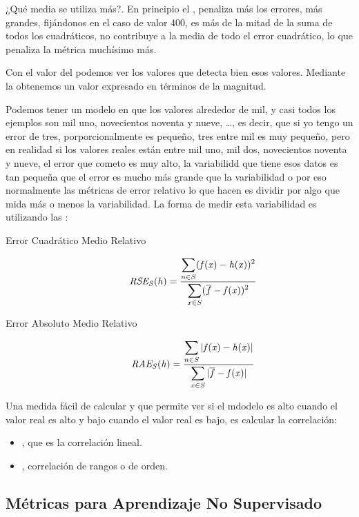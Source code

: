 ¿Qué media se utiliza más?. En principio el , penaliza más los errores, más grandes, fijándonos en el caso de valor 400, es más de la mitad de la suma de todos los cuadráticos, no contribuye a la media de todo el error cuadrático, lo que penaliza la métrica muchísimo más.

Con el valor del  podemos ver los valores que detecta bien esos valores. Mediante la  obtenemos un valor expresado en términos de la magnitud.

Podemos tener un modelo en que los valores alrededor de mil, y casi todos los ejemplos son mil uno, novecientos noventa y nueve, \ldots, es decir, que si yo tengo un error de tres, porporcionalmente es pequeño, tres entre mil es muy pequeño, pero en realidad si los valores reales están entre mil uno, mil dos, novecientos noventa y nueve, el error que cometo es muy alto, la variabilidd que tiene esos datos es tan pequeña que el error es mucho más grande que la variabilidad o por eso normalmente las métricas de error relativo lo que hacen es dividir por algo que mida más o menos la variabilidad. La forma de medir esta variabilidad es utilizando las :

\begin{description}
    \item[Error Cuadrático Medio Relativo]
    $$ \mathit{RSE_S(h)}  = \frac{ \displaystyle{\sum_{n\in S}(\ensuremath{\mathit{f(x)} } - \ensuremath{\mathit{h(x)} })^2 }}{\displaystyle{\sum_{x\in S}(\overline{f} - \ensuremath{\mathit{f(x)} })^2}} $$
    \item[Error Absoluto Medio Relativo]  
    $$ \mathit{RAE_S(h)}  = \frac{ \displaystyle{\sum_{n\in S}|\ensuremath{\mathit{f(x)} } - \ensuremath{\mathit{h(x)} }|}}{\displaystyle{\sum_{x\in S}|\overline{f} - \ensuremath{\mathit{f(x)} }|}} $$
\end{description}

Una medida fácil de calcular y que permite ver si el mdodelo es alto cuando el valor real es alto y bajo cuando el valor real es bajo, es calcular la correlación:
\begin{itemize}
    \item {}, que es la correlación lineal.
    \item {}, correlación de rangos o de orden.
\end{itemize}

\subsection{Métricas para Aprendizaje No Supervisado}

